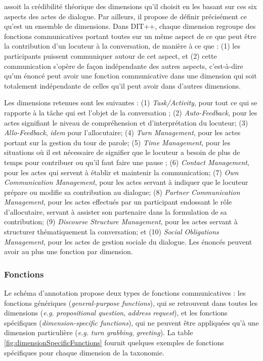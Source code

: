 \documentclass[10pt,a4paper,twoside]{article}
\begin{document}
\citeauthor{bunt2009dit++} assoit la crédibilité théorique des dimensions qu'il choisit en les basant sur ces six aspects des actes de dialogue. Par ailleurs, il propose de définir précisément ce qu'est un ensemble de dimensions. Dans DIT++, chaque dimension regroupe des fonctions communicatives portant toutes sur un même aspect de ce que peut être la contribution d'un locuteur à la conversation, de manière à ce que : (1) les participants puissent communiquer autour de cet aspect, et (2) cette communication s'opère de façon indépendante des autres aspects, c'est-à-dire qu'un énoncé peut avoir une fonction communicative dans une dimension qui soit totalement indépendante de celles qu'il peut avoir dans d'autres dimensions.

Les dimensions retenues sont les suivantes : (1) \textit{Task/Activity}, pour tout ce qui se rapporte à la tâche qui est l'objet de la conversation ; (2) \textit{Auto-Feedback}, pour les actes signifiant le niveau de compréhension et d'interprétation du locuteur; (3) \textit{Allo-Feedback}, \textit{idem} pour l'allocutaire; (4) \textit{Turn Management}, pour les actes portant sur la gestion du tour de parole; (5) \textit{Time Management}, pour les situations où il est nécessaire de signifier que le locuteur a besoin de plus de temps pour contribuer ou qu'il faut faire une pause ; (6) \textit{Contact Management}, pour les actes qui servent à établir et maintenir la communication; (7) \textit{Own Communication Management}, pour les actes servant à indiquer que le locuteur prépare ou modifie sa contribution au dialogue; (8) \textit{Partner Communication Management}, pour les actes effectués par un participant endossant le rôle d'allocutaire, servant à assister son partenaire dans la formulation de sa contribution; (9) \textit{Discourse Structure Management}, pour les actes servant à structurer thématiquement la conversation; et (10) \textit{Social Obligations Management}, pour les actes de gestion sociale du dialogue. Les énoncés peuvent avoir au plus une fonction par dimension.

\subsubsection{Fonctions}

Le schéma d'annotation propose deux types de fonctions communicatives : les fonctions génériques (\textit{general-purpose functions}), qui se retrouvent dans toutes les dimensions (\textit{e.g.} \textit{propositional question}, \textit{address request}), et les fonctions spécifiques (\textit{dimension-specific functions}), qui ne peuvent être appliquées qu'à une dimension particulière (\textit{e.g.} \textit{turn grabbing}, \textit{greeting}). La table \ref{fig:dimensionSpecificFunctions} fournit quelques exemples de fonctions spécifiques pour chaque dimension de la taxonomie.
\end{document}
